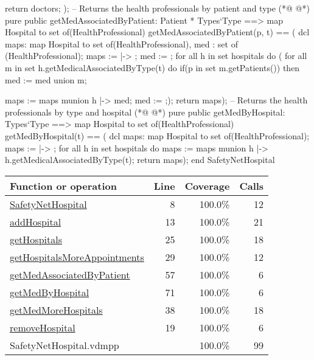 \begin{vdmpp}[breaklines=true]
                  return doctors;
                 );
 -- Returns the health professionals by patient and type                              
(*@
\label{getMedAssociatedByPatient:57}
@*)
 pure public getMedAssociatedByPatient: Patient * Types`Type ==> map Hospital to set of(HealthProfessional)
  getMedAssociatedByPatient(p, t) == (
                     dcl maps: map Hospital to set of(HealthProfessional), med : set of (HealthProfessional);
                     maps := { |-> };
                     med := {};
                     for all h in set hospitals do (
                      for all m in set h.getMedicalAssociatedByType(t) do
                       if(p in set m.getPatients())
                        then med := med union {m};
                       
                      maps := maps munion {h |-> med};
                      med := {};);
                      return maps);
 -- Returns the health professionals by type and hospital
(*@
\label{getMedByHospital:71}
@*)
 pure public getMedByHospital: Types`Type ==> map Hospital to set of(HealthProfessional)
  getMedByHospital(t) == (
                     dcl maps: map Hospital to set of(HealthProfessional);
                     maps := { |-> };
                     for all h in set hospitals do
                      maps := maps munion {h |-> h.getMedicalAssociatedByType(t)};
                     return maps);
end SafetyNetHospital
\end{vdmpp}
\bigskip
\begin{longtable}{|l|r|r|r|}
\hline
Function or operation & Line & Coverage & Calls \\
\hline
\hline
\hyperref[SafetyNetHospital:8]{SafetyNetHospital} & 8&100.0\% & 12 \\
\hline
\hyperref[addHospital:13]{addHospital} & 13&100.0\% & 21 \\
\hline
\hyperref[getHospitals:25]{getHospitals} & 25&100.0\% & 18 \\
\hline
\hyperref[getHospitalsMoreAppointments:29]{getHospitalsMoreAppointments} & 29&100.0\% & 12 \\
\hline
\hyperref[getMedAssociatedByPatient:57]{getMedAssociatedByPatient} & 57&100.0\% & 6 \\
\hline
\hyperref[getMedByHospital:71]{getMedByHospital} & 71&100.0\% & 6 \\
\hline
\hyperref[getMedMoreHospitals:38]{getMedMoreHospitals} & 38&100.0\% & 18 \\
\hline
\hyperref[removeHospital:19]{removeHospital} & 19&100.0\% & 6 \\
\hline
\hline
SafetyNetHospital.vdmpp & & 100.0\% & 99 \\
\hline
\end{longtable}

